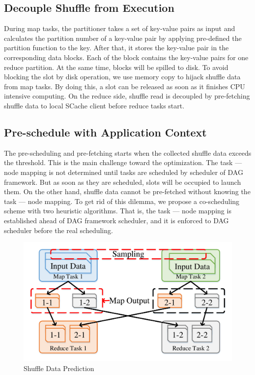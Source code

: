 \subsection{Decouple Shuffle from Execution}
During map tasks, the partitioner takes a set of key-value pairs as input and calculates the partition number of a key-value pair by applying pre-defined the partition function to the key. After that, it stores the key-value pair in the corresponding data blocks. Each of the block contains the key-value pairs for one reduce partition. At the same time, blocks will be spilled to disk. To avoid blocking the slot by disk operation, we use memory copy to hijack shuffle data from map tasks. By doing this, a slot can be released as soon as it finishes CPU intensive computing. 
On the reduce side, shuffle read is decoupled by pre-fetching shuffle data to local SCache client before reduce tasks start.


\subsection{Pre-schedule with Application Context}
The pre-scheduling and pre-fetching starts when the collected shuffle data exceeds the threshold.
This is the main challenge toward the optimization. The task --- node mapping is not determined until tasks are scheduled by scheduler of DAG framework. But as soon as they are scheduled, slots will be occupied to launch them. On the other hand, shuffle data cannot be pre-fetched without knowing the task --- node mapping.
To get rid of this dilemma, we propose a co-scheduling scheme with two heuristic algorithms. That is, the task --- node mapping is established ahead of DAG framework scheduler, and it is enforced to DAG scheduler before the real scheduling.


\begin{figure}
	\centering
	\includegraphics[width=0.9\linewidth]{fig/shuffle}
	\caption{Shuffle Data Prediction}
	\label{fig:shuffle}
\end{figure}

